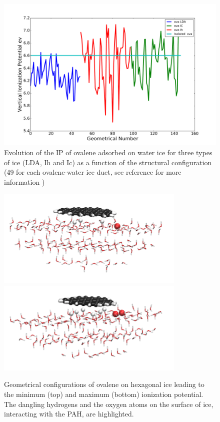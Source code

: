 \documentclass[]{interact}
\theoremstyle{plain}%
\theoremstyle{definition}
\theoremstyle{remark}
\begin{document}

  \begin{figure}[!ht]
   \begin{center}
\includegraphics[width=14cm]{ova_LDA_IC_IH.pdf}
\end{center}
\caption{Evolution of the IP of ovalene adsorbed on water ice for three types of ice (LDA, Ih and Ic) as a function of the structural configuration (49 for each ovalene-water ice duet, see reference \cite{Michoulier18b} for more information )}
\label{fig:IP}
\end{figure}


\begin{figure}[!ht]
   \begin{center}
\includegraphics[width=9cm]{ova_Ih_31_min.png} \includegraphics[width=9cm]{ova_Ih_34_max.png}
\end{center}
\caption{Geometrical configurations of ovalene on hexagonal ice leading to the minimum (top) and maximum (bottom) ionization potential. The dangling hydrogens and the oxygen atoms on the surface of ice, interacting with the PAH, are highlighted. }
\label{fig:config}
\end{figure}
\end{document}
